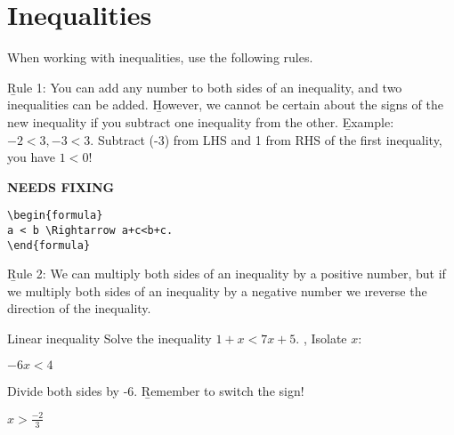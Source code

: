 \section{Inequalities}
When working with inequalities, use the following rules.

\b{Rule 1}: You can add any number to both sides of an inequality, and two inequalities can be added. \b{However}, we cannot be certain about the signs of the new inequality if you subtract one inequality from the other. %
\b{Example}: $-2 < 3, -3 < 3.$
Subtract (-3) from LHS and 1 from RHS of the first inequality, you have $1 < 0$! %


{\hfill\Large\bfseries NEEDS FIXING\hfill}
\begin{lstlisting}
\begin{formula}
a < b \Rightarrow a+c<b+c.
\end{formula}
 \end{lstlisting} %

\b{Rule 2}: We can multiply both sides of an inequality by a positive number, but if we multiply both sides of an inequality by a negative number we \i{reverse} the direction of the inequality. %

\begin{example}{Linear inequality}
Solve the inequality $1+x<7x+5$.
\sep
Isolate $x$:
\begin{center}
\centering $-6x < 4$
\end{center}
Divide both sides by -6.
\b{Remember to switch the sign!}

\begin{center}
\centering $x>\frac{-2}{3}$
\end{center}
\end{example}

